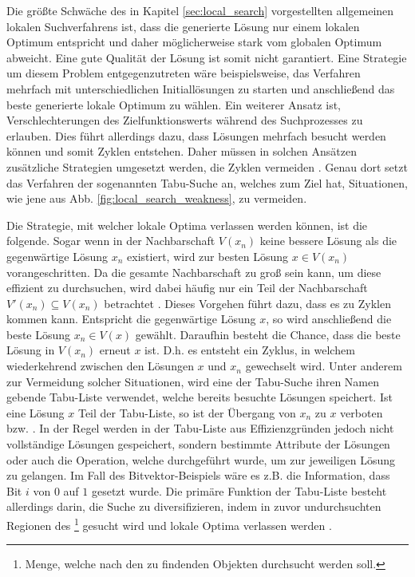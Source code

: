 Die größte Schwäche des in Kapitel \ref{sec:local_search} vorgestellten allgemeinen lokalen Suchverfahrens
ist, dass die generierte Lösung nur einem lokalen Optimum entspricht und daher möglicherweise stark vom globalen
Optimum abweicht. Eine gute Qualität der Lösung ist somit nicht garantiert.
Eine Strategie um diesem Problem entgegenzutreten wäre beispielsweise, das Verfahren mehrfach mit unterschiedlichen
Initiallösungen zu starten und anschließend das beste generierte lokale Optimum zu wählen.
Ein weiterer Ansatz ist, Verschlechterungen des Zielfunktionswerts während des Suchprozesses zu erlauben.
Dies führt allerdings dazu, dass Lösungen mehrfach besucht werden können und somit Zyklen entstehen.
Daher müssen in solchen Ansätzen zusätzliche Strategien umgesetzt werden, die Zyklen vermeiden \cite{Brucker2006}.
Genau dort setzt das Verfahren der sogenannten Tabu-Suche an, welches zum Ziel hat, Situationen, wie jene aus
Abb. \ref{fig:local_search_weakness}, zu vermeiden.

Die Strategie, mit welcher lokale Optima verlassen werden können, ist die folgende.
Sogar wenn in der Nachbarschaft $V(x_n)$ keine bessere Lösung als die gegenwärtige Lösung $x_n$ existiert,
wird zur besten Lösung $x \in V(x_n)$ vorangeschritten.
Da die gesamte Nachbarschaft zu groß sein kann, um diese effizient zu durchsuchen,
wird dabei häufig nur ein Teil der Nachbarschaft $V'(x_n) \subseteq V(x_n)$ betrachtet \cite{Pirlot1996}.
Dieses Vorgehen führt dazu, dass es zu Zyklen kommen kann. Entspricht die gegenwärtige Lösung $x$,
so wird anschließend die beste Lösung $x_n \in V(x)$ gewählt. Daraufhin besteht die Chance,
dass die beste Lösung in $V(x_n)$ erneut $x$ ist. D.h. es entsteht ein Zyklus, in welchem wiederkehrend
zwischen den Lösungen $x$ und $x_n$ gewechselt wird.
Unter anderem zur Vermeidung solcher Situationen, wird eine der Tabu-Suche ihren Namen gebende Tabu-Liste verwendet,
welche bereits besuchte Lösungen speichert. Ist eine Lösung $x$ Teil der Tabu-Liste, so ist der Übergang
von $x_n$ zu $x$ verboten bzw. .
In der Regel werden in der Tabu-Liste aus Effizienzgründen jedoch nicht vollständige Lösungen gespeichert, sondern
bestimmte Attribute der Lösungen oder auch die Operation, welche durchgeführt wurde, um zur jeweiligen Lösung zu gelangen. Im Fall des Bitvektor-Beispiels wäre es z.B. die Information, dass Bit $i$ von $0$ auf $1$ gesetzt wurde.
Die primäre Funktion der Tabu-Liste besteht allerdings darin, die Suche zu diversifizieren,
indem in zuvor undurchsuchten Regionen des \footnote{Menge, welche nach den zu findenden Objekten durchsucht werden soll.} gesucht wird und lokale Optima verlassen werden \cite{Pirlot1996}.

